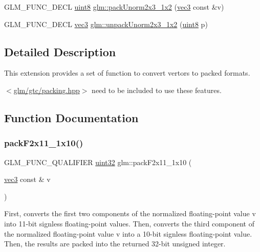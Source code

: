 \begin{DoxyCompactItemize}
\item 
G\+L\+M\+\_\+\+F\+U\+N\+C\+\_\+\+D\+E\+CL \hyperlink{group__gtc__type__precision_ga1a7dcd8aac97cc8020817c94049deff2}{uint8} \hyperlink{group__gtc__packing_ga0acca4eb99c300fe2edeef7ebd8fa08b}{glm\+::pack\+Unorm2x3\+\_\+1x2} (\hyperlink{group__core__types_ga1c47e8b3386109bc992b6c48e91b0be7}{vec3} const \&v)
\item 
G\+L\+M\+\_\+\+F\+U\+N\+C\+\_\+\+D\+E\+CL \hyperlink{group__core__types_ga1c47e8b3386109bc992b6c48e91b0be7}{vec3} \hyperlink{group__gtc__packing_gaeeacc5275329100c50fe8fc0871eb423}{glm\+::unpack\+Unorm2x3\+\_\+1x2} (\hyperlink{group__gtc__type__precision_ga1a7dcd8aac97cc8020817c94049deff2}{uint8} p)
\end{DoxyCompactItemize}


\subsection{Detailed Description}
This extension provides a set of function to convert vertors to packed formats. 

$<$\hyperlink{gtc_2packing_8hpp}{glm/gtc/packing.\+hpp}$>$ need to be included to use these features. 

\subsection{Function Documentation}
\mbox{\label{group__gtc__packing_ga8c2a0eeee677ca4dafd9e093d9e81062}} 
\subsubsection{\texorpdfstring{pack\+F2x11\+\_\+1x10()}{packF2x11\_1x10()}}
{\footnotesize\ttfamily G\+L\+M\+\_\+\+F\+U\+N\+C\+\_\+\+Q\+U\+A\+L\+I\+F\+I\+ER \hyperlink{group__gtc__type__precision_ga202b6a53c105fcb7e531f9b443518451}{uint32} glm\+::pack\+F2x11\+\_\+1x10 (\begin{DoxyParamCaption}\item[{\hyperlink{group__core__types_ga1c47e8b3386109bc992b6c48e91b0be7}{vec3} const \&}]{v }\end{DoxyParamCaption})}

First, converts the first two components of the normalized floating-\/point value v into 11-\/bit signless floating-\/point values. Then, converts the third component of the normalized floating-\/point value v into a 10-\/bit signless floating-\/point value. Then, the results are packed into the returned 32-\/bit unsigned integer.

